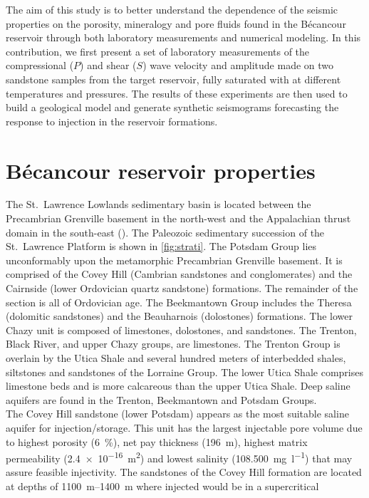 The aim of this study is to better understand the dependence of the seismic
properties on the porosity, mineralogy and pore fluids found in the
Bé\-can\-cour reservoir through both laboratory measurements and numerical
modeling.  In this contribution, we first present a set of laboratory
measurements of the compressional ($P$) and shear ($S$) wave velocity and
amplitude made on two sandstone samples from the target reservoir, fully
saturated with  at different temperatures and pressures. The results of
these experiments are then used to build a geological model and generate
synthetic seismograms forecasting the response to  injection in the
reservoir formations.
\section{Bécancour reservoir properties}
The St.\ Lawrence Lowlands sedimentary basin is located between the Precambrian
Grenville basement in the north-west and the Appalachian thrust domain in the
south-east (). The Paleozoic sedimentary succession of the St.\
Lawrence Platform is shown in \cref{fig:strati}. The Potsdam Group lies
unconformably upon the metamorphic Precambrian Grenville basement. It is
comprised of the Covey Hill (Cambrian sandstones and conglomerates) and the
Cairnside (lower Ordovician quartz sandstone) formations. The remainder of the
section is all of Ordovician age. The Beekmantown Group includes the Theresa
(dolomitic sandstones) and the Beau\-har\-nois (dolostones) formations. The
lower Chazy unit is composed of limestones, dolostones, and sandstones. The
Trenton, Black River, and upper Chazy groups, are limestones. The Trenton Group
is overlain by the Utica Shale and several hundred meters of interbedded shales,
siltstones and sandstones of the Lorraine Group. The lower Utica Shale comprises
limestone beds and is more calcareous than the upper Utica Shale. Deep saline
aquifers are found in the Trenton, Beekmantown and Potsdam Groups.\\
The Covey Hill sandstone (lower Potsdam) appears as the most suitable saline
aquifer for \ce{CO2} injection/storage. This unit has the largest injectable
pore volume due to highest porosity (\SI{6}{\percent}), net pay thickness
(\SI{196}{\metre}), highest matrix permeability (\SI{2.4e-16}{\metre\squared})
and lowest salinity (\SI[per-mode=symbol]{108.500}{\milli\gram\per\litre}) that
may assure feasible injectivity.
The sandstones of the Covey Hill formation are located at depths of
\SIrange{1100}{1400}{\metre} where injected \ce{CO2} would be in a supercritical
